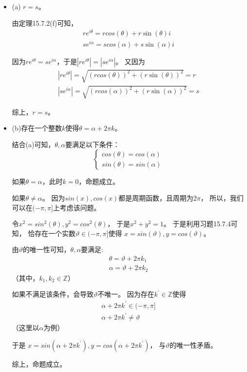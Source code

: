 \documentclass{article}
\begin{document}
\begin{itemize}
  \item (a) $r = s$。

        由定理15.7.2(f)可知，
        \begin{align*}
          re^{i\theta} = r cos(\theta) + r\sin(\theta)i \\
          se^{i\alpha} = s cos(\alpha) + s\sin(\alpha)i
        \end{align*}

        因为$re^{i\theta} = se^{i\alpha}$，于是$|re^{i\theta}| = |se^{i\alpha}|$。
        又因为
        \begin{align*}
          |re^{i\theta}| = \sqrt{(r cos(\theta))^2 + (r\sin(\theta))^2} = r \\
          |se^{i\alpha}| = \sqrt{(r cos(\alpha))^2 + (r\sin(\alpha))^2} = s
        \end{align*}

        综上，$r = s$。

  \item (b)存在一个整数$k$使得$\theta = \alpha + 2\pi k$。

        结合(a)可知，$\theta, \alpha$要满足以下条件：
        \begin{equation*}
          \begin{cases*}
            cos(\theta) = cos(\alpha) \\
            sin(\theta) = sin(\alpha)
          \end{cases*}
        \end{equation*}

        如果$\theta = \alpha$，此时$k = 0$，命题成立。

        如果$\theta \neq \alpha$。
        因为$sin(x), cos(x)$都是周期函数，且周期为$2\pi$，
        所以，我们可以在$(-\pi, \pi]$上考虑该问题。

        令$x^2 = sin^2(\theta), y^2 = cos^2(\theta)$，
        于是$x^2 + y^2 = 1$。
        于是利用习题15.7.4可知，
        恰存在一个实数$\vartheta \in (-\pi, \pi]$使得
        $x = sin(\vartheta), y = cos(\vartheta)$。

        由$\vartheta$的唯一性可知，$\theta, \alpha$要满足:
        \begin{align*}
          \theta = \vartheta + 2\pi k_1 \\
          \alpha = \vartheta + 2\pi k_2
        \end{align*}
        （其中，$k_1, k_2 \in \mathbb{Z}$）

        如果不满足该条件，会导致$\vartheta$不唯一。
        因为存在$k^\prime \in \mathbb{Z}$使得
        \begin{align*}
          \alpha + 2\pi k^\prime \in (-\pi, \pi] \\
          \alpha + 2\pi k^\prime \neq \vartheta
        \end{align*}
        （这里以$\alpha$为例）

        于是
        $x = sin(\alpha + 2\pi k^\prime), y = cos(\alpha + 2\pi k^\prime)$，
        与$\vartheta$的唯一性矛盾。

        综上，命题成立。
\end{itemize}
\end{document}
